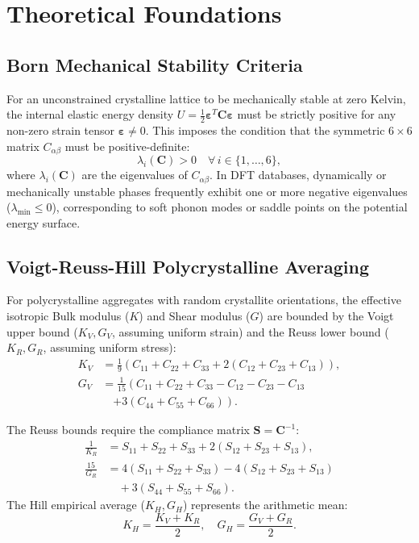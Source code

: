\documentclass[twocolumn,10pt,aps,prb,superscriptaddress,floatfix]{revtex4-2}
\begin{document}
\section{Theoretical Foundations}
\label{sec:theory}

\subsection{Born Mechanical Stability Criteria}
For an unconstrained crystalline lattice to be mechanically stable at zero Kelvin, the internal elastic energy density $U = \frac{1}{2} \bm{\varepsilon}^T \bm{C} \bm{\varepsilon}$ must be strictly positive for any non-zero strain tensor $\bm{\varepsilon} \ne 0$. This imposes the condition that the symmetric $6 \times 6$ matrix $C_{\alpha\beta}$ must be positive-definite:
\begin{equation}
\lambda_i(\bm{C}) > 0 \quad \forall \, i \in \{1, \dots, 6\},
\label{eq:born}
\end{equation}
where $\lambda_i(\bm{C})$ are the eigenvalues of $C_{\alpha\beta}$. In DFT databases, dynamically or mechanically unstable phases frequently exhibit one or more negative eigenvalues ($\lambda_{\min} \le 0$), corresponding to soft phonon modes or saddle points on the potential energy surface.

\subsection{Voigt-Reuss-Hill Polycrystalline Averaging}
For polycrystalline aggregates with random crystallite orientations, the effective isotropic Bulk modulus ($K$) and Shear modulus ($G$) are bounded by the Voigt upper bound ($K_V, G_V$, assuming uniform strain) and the Reuss lower bound ($K_R, G_R$, assuming uniform stress):
\begin{align}
K_V &= \frac{1}{9} \left( C_{11} + C_{22} + C_{33} + 2(C_{12} + C_{23} + C_{13}) \right), \label{eq:kv} \\
G_V &= \frac{1}{15} \left( C_{11} + C_{22} + C_{33} - C_{12} - C_{23} - C_{13} \right. \nonumber \\
    &\quad \left. + 3(C_{44} + C_{55} + C_{66}) \right). \label{eq:gv}
\end{align}

The Reuss bounds require the compliance matrix $\bm{S} = \bm{C}^{-1}$:
\begin{align}
\frac{1}{K_R} &= S_{11} + S_{22} + S_{33} + 2(S_{12} + S_{23} + S_{13}), \label{eq:kr} \\
\frac{15}{G_R} &= 4(S_{11} + S_{22} + S_{33}) - 4(S_{12} + S_{23} + S_{13}) \nonumber \\
               &\quad + 3(S_{44} + S_{55} + S_{66}). \label{eq:gr}
\end{align}
The Hill empirical average ($K_H, G_H$) represents the arithmetic mean:
\begin{equation}
K_H = \frac{K_V + K_R}{2}, \quad G_H = \frac{G_V + G_R}{2}.
\label{eq:hill}
\end{equation}
\end{document}
